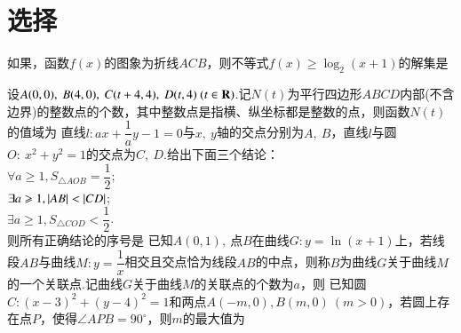 \documentclass{BHCexam}
\begin{document}
\fubiaoti{ }
\maketitle
\tableofcontents
\section{选择}
\begin{questions}
\qs 如果，函数$f(x)$的图象为折线$ ACB $，则不等式$ f(x)\ge \log_2(x+1) $的解集是\xx
\begin{center}
\end{center}
\vspace{-2em}
\qs 设$ A(0,0),~B(4,0),~C(t+4,4),~D(t,4)~(t\in\mathbf{R}) $.记$ N(t) $为平行四边形$ ABCD $内部(不含边界)的整数点的个数，其中整数点是指横、纵坐标都是整数的点，则函数$ N(t) $的值域为\xx
{}
\qs 直线$ l:ax+\dfrac{1}{a}y-1=0 $与$x,~y$轴的交点分别为$ A,~B $，直线$ l $与圆$ O:~x^2+y^2=1 $的交点为$ C,~D .$给出下面三个结论：\\
 $ \forall a\ge 1,S_{\triangle AOB}=\dfrac{1}{2} $;\\
 $\exists a\geqslant1,\left|AB\right|<\left|CD\right|$;\\
 $\exists a\ge 1,S_{\triangle COD}<\dfrac{1}{2}$.\\
则所有正确结论的序号是\xx
{} 
\qs 已知$ A(0,1),~ $点$ B $在曲线$ G:y=\ln (x+1) $上，若线段$ AB $与曲线$ M:y=\dfrac{1}{x} $相交且交点恰为线段$ AB $的中点，则称$ B $为曲线$ G $关于曲线$ M $的一个关联点.记曲线$ G $关于曲线$ M $的关联点的个数为$ a $，则\xx
{}
\qs 已知圆$ C:(x-3)^2+(y-4)^2=1 $和两点$ A(-m,0),B(m,0)~(m>0) $，若圆上存在点$ P $，使得$ \angle APB=90^{\circ} $，则$ m $的最大值为\xx

\end{questions}
\end{document}
